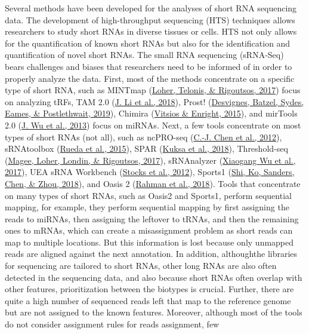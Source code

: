 \documentclass[12pt,twoside]{reedthesis}
\begin{document}
Several methods have been developed for the analyses of short RNA
sequencing data. The development of high-throughput sequencing (HTS)
techniques allows researchers to study short RNAs in diverse tissues or
cells. HTS not only allows for the quantification of known short RNAs
but also for the identification and quantification of novel short RNAs.
The small RNA sequencing (sRNA-Seq) bears challenges and biases that
researchers need to be informed of in order to properly analyze the
data. First, most of the methods concentrate on a specific type of short
RNA, such as MINTmap (\protect\hyperlink{ref-loher2017}{Loher, Telonis, \& Rigoutsos, 2017}) focus on analyzing tRFs, TAM 2.0
(\protect\hyperlink{ref-li2018}{J. Li et al., 2018}), Prost! (\protect\hyperlink{ref-desvignes2019}{Desvignes, Batzel, Sydes, Eames, \& Postlethwait, 2019}), Chimira (\protect\hyperlink{ref-vitsios2015}{Vitsios \& Enright, 2015}), and mirTools
2.0 (\protect\hyperlink{ref-wu2013}{J. Wu et al., 2013}) focus on miRNAs. Next, a few tools concentrate on most
types of short RNAs (not all), such as ncPRO-seq (\protect\hyperlink{ref-chen2012}{C.-J. Chen et al., 2012}),
sRNAtoolbox (\protect\hyperlink{ref-rueda2015}{Rueda et al., 2015}), SPAR (\protect\hyperlink{ref-kuksa2018}{Kuksa et al., 2018}), Threshold-seq (\protect\hyperlink{ref-magee2017}{Magee, Loher, Londin, \& Rigoutsos, 2017}),
sRNAnalyzer (\protect\hyperlink{ref-wu2017}{Xiaogang Wu et al., 2017}), UEA sRNA Workbench (\protect\hyperlink{ref-stocks2012}{Stocks et al., 2012}), Sports1
(\protect\hyperlink{ref-shi2018}{Shi, Ko, Sanders, Chen, \& Zhou, 2018}), and Oasis 2 (\protect\hyperlink{ref-rahman2018}{Rahman et al., 2018}). Tools that concentrate on many
types of short RNAs, such as Oasis2 and Sports1, perform sequential
mapping, for example, they perform sequential mapping by first assigning
the reads to miRNAs, then assigning the leftover to tRNAs, and then the
remaining ones to mRNAs, which can create a misassignment problem as
short reads can map to multiple locations. But this information is lost
because only unmapped reads are aligned against the next annotation. In
addition, althoughthe libraries for sequencing are tailored to short
RNAs, other long RNAs are also often detected in the sequencing data,
and also because short RNAs often overlap with other features,
prioritization between the biotypes is crucial. Further, there are quite
a high number of sequenced reads left that map to the reference genome
but are not assigned to the known features. Moreover, although most of
the tools do not consider assignment rules for reads assignment, few
\end{document}
